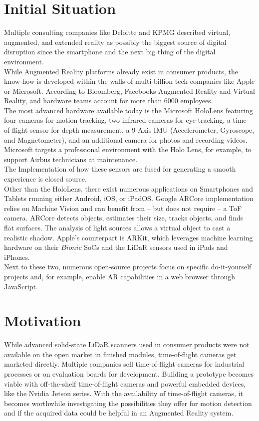 \section{Initial Situation}
\label{sec:Situation}
Multiple consulting companies like Deloitte and KPMG described virtual, augmented, and extended reality as possibly the biggest source of digital disruption since the smartphone\cite{KPMG_on_AR} and the next big thing of the digital environment\cite{Deloitte_on_AR}.\\
While Augmented Reality platforms already exist in consumer products, the know-how is developed within the walls of multi-billion tech companies like Apple or Microsoft. According to Bloomberg, Facebooks Augmented Reality and Virtual Reality, and hardware teams account for more than 6000 employees\cite{Bloomberg_on_AR}. \\
The most advanced hardware available today is the Microsoft HoloLens\cite{Hololens} featuring four cameras for motion tracking, two infrared cameras for eye-tracking, a time-of-flight sensor for depth measurement, a 9-Axis IMU (Accelerometer, Gyroscope, and Magnetometer), and an additional camera for photos and recording videos. Microsoft targets a professional environment with the Holo Lens, for example, to support Airbus technicians at maintenance\cite{AirbusHololens}.\\
The Implementation of how these sensors are fused for generating a smooth experience is closed source.\\
Other than the HoloLens, there exist numerous applications on Smartphones and Tablets running either Android, iOS, or iPadOS. Google ARCore implementation relies on Machine Vision and can benefit from – but does not require –  a ToF camera. ARCore detects objects, estimates their size, tracks objects, and finds flat surfaces. The analysis of light sources allows a virtual object to cast a realistic shadow. Apple’s counterpart is ARKit, which leverages machine learning hardware on their $Bionic$ SoCs and the LiDaR sensors used in iPads and iPhones.\cite{AppleLidar}\\
Next to these two, numerous open-source projects focus on specific do-it-yourself projects and, for example, enable AR capabilities in a web browser through JavaScript\cite{ar_js}\cite{argon_js}. 
\section{Motivation}
\label{sec:Motivation}
While advanced solid-state LiDaR scanners used in consumer products were not available on the open market in finished modules, time-of-flight cameras get marketed directly. Multiple companies sell time-of-flight cameras for industrial processes or on evaluation boards for development. Building a prototype becomes viable with off-the-shelf time-of-flight cameras and powerful embedded devices, like the Nvidia Jetson series. 
With the availability of time-of-flight cameras, it becomes worthwhile investigating the possibilities they offer for motion detection and if the acquired data could be helpful in an Augmented Reality system. 

